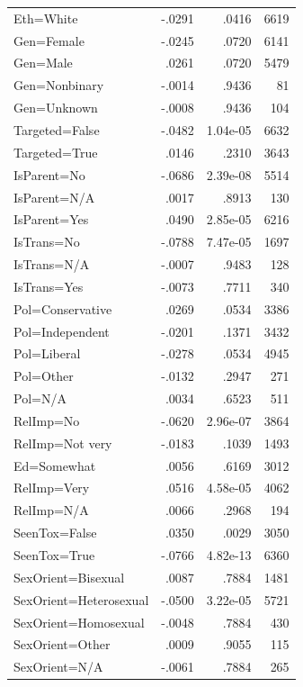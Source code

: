 \documentclass{article} %
\theoremstyle{definition}
\theoremstyle{plain}
\begin{document}
\begin{table}[t]
\begin{tabularx}{\columnwidth}{X r r r}
		\rowcolor{gray!15}
		Eth=White & -.0291 & .0416 & 6619 \\
		\rowcolor{gray!15}
		Gen=Female & -.0245 & .0720 & 6141 \\
		Gen=Male & .0261 & .0720 & 5479 \\
		\rowcolor{gray!15}
		Gen=Nonbinary & -.0014 & .9436 & 81 \\
		\rowcolor{gray!15}
		Gen=Unknown & -.0008 & .9436 & 104 \\
		\rowcolor{gray!15}
		Targeted=False & -.0482 & 1.04e-05 & 6632 \\
		Targeted=True & .0146 & .2310 & 3643 \\
		\rowcolor{gray!15}
		IsParent=No & -.0686 & 2.39e-08 & 5514 \\
		IsParent=N/A & .0017 & .8913 & 130 \\
		IsParent=Yes & .0490 & 2.85e-05 & 6216 \\
		\rowcolor{gray!15}
		IsTrans=No & -.0788 & 7.47e-05 & 1697 \\
		\rowcolor{gray!15}
		IsTrans=N/A & -.0007 & .9483 & 128 \\
		\rowcolor{gray!15}
		IsTrans=Yes & -.0073 & .7711 & 340 \\
		
		Pol=Conservative & .0269 & .0534 & 3386 \\
		\rowcolor{gray!15}
		Pol=Independent & -.0201 & .1371 & 3432 \\
		\rowcolor{gray!15}
		Pol=Liberal & -.0278 & .0534 & 4945 \\
		\rowcolor{gray!15}
		Pol=Other & -.0132 & .2947 & 271 \\
		Pol=N/A & .0034 & .6523 & 511 \\
		\rowcolor{gray!15}
		RelImp=No & -.0620 & 2.96e-07 & 3864 \\
		\rowcolor{gray!15}
		RelImp=Not very & -.0183 & .1039 & 1493 \\
		Ed=Somewhat & .0056 & .6169 & 3012 \\
		RelImp=Very & .0516 & 4.58e-05 & 4062 \\
		RelImp=N/A & .0066 & .2968 & 194 \\
		
		SeenTox=False & .0350 & .0029 & 3050 \\
		\rowcolor{gray!15}
		SeenTox=True & -.0766 & 4.82e-13 & 6360 \\
		
		SexOrient=Bisexual & .0087 & .7884 & 1481 \\
		\rowcolor{gray!15}
		SexOrient=Heterosexual & -.0500 & 3.22e-05 & 5721 \\
		\rowcolor{gray!15}
		SexOrient=Homosexual & -.0048 & .7884 & 430 \\
		SexOrient=Other & .0009 & .9055 & 115 \\
		\rowcolor{gray!15}
		SexOrient=N/A & -.0061 & .7884 & 265 \\
		

\end{tabularx}
\end{table}
\end{document}
